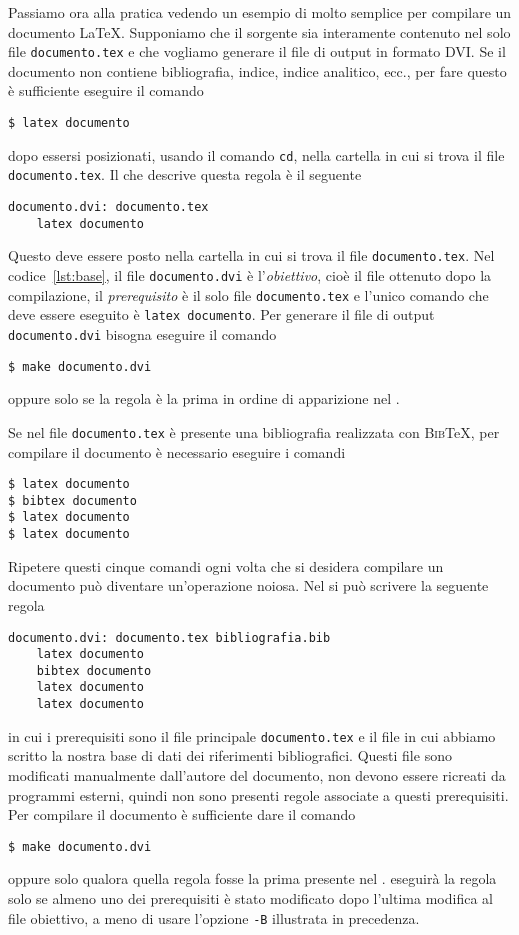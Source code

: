 Passiamo ora alla pratica vedendo un esempio di  molto
semplice per compilare un documento \LaTeX{}.
Supponiamo che il sorgente sia interamente contenuto nel solo file
\texttt{documento.tex} e che vogliamo generare il file di output in formato DVI.
Se il documento non contiene bibliografia, indice, indice analitico, ecc., per
fare questo è sufficiente eseguire il comando
\begin{verbatim}
$ latex documento
\end{verbatim}
dopo essersi posizionati, usando il comando \texttt{cd}, nella cartella in cui
si trova il file \texttt{documento.tex}.  Il  che descrive
questa regola è il seguente
\begin{lstlisting}[caption={Un semplice \filestyle{Makefile}.},label=lst:base]
documento.dvi: documento.tex
	latex documento
\end{lstlisting}
Questo  deve essere posto nella cartella in cui si trova il
file \texttt{documento.tex}.  Nel codice~\ref{lst:base}, il file
\texttt{documento.dvi} è l'\emph{obiettivo}, cioè il file ottenuto dopo la
compilazione, il \emph{prerequisito} è il solo file \texttt{documento.tex} e
l'unico comando che deve essere eseguito è \texttt{latex documento}.  Per
generare il file di output \texttt{documento.dvi} bisogna eseguire il comando
\begin{verbatim}
$ make documento.dvi
\end{verbatim}
oppure solo  se la regola è la prima in ordine di apparizione
nel .

Se nel file \texttt{documento.tex} è presente una bibliografia realizzata con
\textsc{Bib}\TeX, per compilare il documento è necessario eseguire i comandi
\begin{verbatim}
$ latex documento
$ bibtex documento
$ latex documento
$ latex documento
\end{verbatim}
Ripetere questi cinque comandi ogni volta che si desidera compilare un documento
può diventare un'operazione noiosa.  Nel  si può scrivere la
seguente regola
\begin{lstlisting}
documento.dvi: documento.tex bibliografia.bib
	latex documento
	bibtex documento
	latex documento
	latex documento
\end{lstlisting}
in cui i prerequisiti sono il file principale \texttt{documento.tex} e il file
in cui abbiamo scritto la nostra base di dati dei riferimenti bibliografici.
Questi file sono modificati manualmente dall'autore del documento, non devono
essere ricreati da programmi esterni, quindi non sono presenti regole associate
a questi prerequisiti.  Per compilare il documento è sufficiente dare il comando
\begin{verbatim}
$ make documento.dvi
\end{verbatim}
oppure solo  qualora quella regola fosse la prima presente nel
.   eseguirà la regola solo se almeno uno
dei prerequisiti è stato modificato dopo l'ultima modifica al file obiettivo, a
meno di usare l'opzione \texttt{-B} illustrata in precedenza.

